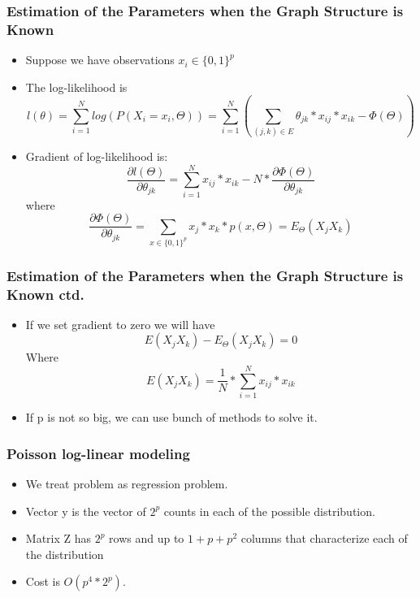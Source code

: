 \documentclass{beamer}
\begin{document}
\begin{frame}
\frametitle{ Estimation of the Parameters when the Graph Structure is Known}
\begin{itemize}
\item Suppose we have observations $x_i \in \{0,1\}^p$
\item The log-likelihood is
\begin{equation}
l(\theta) = \sum_{i=1}^N log( P(X_i = x_i, \Theta)) = \sum_{i=1}^N (\sum_{(j, k) \in E} \theta_{jk} * x_{ij} * x_{ik} - \Phi(\Theta))
\end{equation} 
\item Gradient of log-likelihood is:
\begin{equation}
\frac{\partial l(\Theta)}{\partial \theta_{jk}} = \sum_{i=1}^N x_{ij} * x_{ik} - N * \frac{\partial \Phi(\Theta)}{\partial \theta_{jk}} 
\end{equation}
where
\begin{equation}
\frac{\partial \Phi(\Theta)}{\partial \theta_{jk}}  = \sum_{x \in \{0, 1\}^p} x_j * x_k * p(x, \Theta)= E_{\Theta}(X_jX_k)
\end{equation}
\end{itemize}
\end{frame}

\begin{frame}
\frametitle{ Estimation of the Parameters when the Graph Structure is Known ctd.}
\begin{itemize}
\item If we set gradient to zero we will have 
\begin{equation}
E( X_jX_k ) − E_{\Theta}(X_jX_k) = 0
\end{equation}
Where 
\begin{equation}
E( X_jX_k )= \frac{1}{N} * \sum_{i=1}^N x_{ij} * x_{ik} 
\end{equation}
\item If p is not so big, we can use bunch of methods to solve it.
\end{itemize}
\end{frame}

\begin{frame}
\frametitle{ Poisson log-linear modeling}
\begin{itemize}
\item We treat problem as regression problem.
\item Vector y is the vector of $2^p$ counts in each of the possible distribution.
\item Matrix Z has $2^p$ rows and up to $1+p+p^2$ columns that characterize each of the distribution
\item Cost is $O(p^4 * 2^p)$. 
\end{itemize}
\end{frame}
\end{document}
